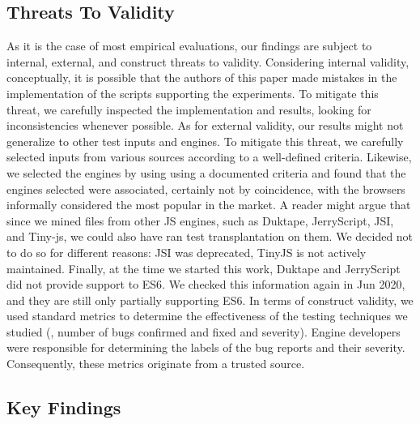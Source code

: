 \documentclass[smallextended]{svjour3}
\begin{document}
\subsection{Threats To Validity}

As it is the case of most empirical evaluations, our findings are
subject to internal, external, and construct threats to
validity. Considering internal validity, conceptually, it is possible
that the authors of this paper made mistakes in the implementation of
the scripts supporting the experiments. To mitigate this threat, we
carefully inspected the implementation and results, looking for
inconsistencies whenever possible. As for external validity, our
results might not generalize to other test inputs and engines. To
mitigate this threat, we carefully selected inputs from various
sources according to a well-defined criteria. Likewise, we selected
the engines by using using a documented criteria and found that the
engines selected were associated, certainly not by coincidence, with
the browsers informally considered the most popular in the market.  A
reader might argue that since we mined files from other JS engines,
such as Duktape, JerryScript, JSI, and Tiny-js, we could also have ran
test transplantation on them. We decided not to do so for different
reasons: JSI was deprecated, TinyJS is not actively
maintained. Finally, at the time we started this work, Duktape and
JerryScript did not provide support to ES6. We checked this
information again in Jun 2020, and they are still only partially
supporting ES6. In terms of construct validity, we used standard
metrics to determine the effectiveness of the testing techniques we
studied (\eg{}, number of bugs confirmed and fixed and
severity). Engine developers were responsible for determining the
labels of the bug reports and their severity. Consequently, these
metrics originate from a trusted source.


\subsection{Key Findings}
\label{sec:findings}
\end{document}
